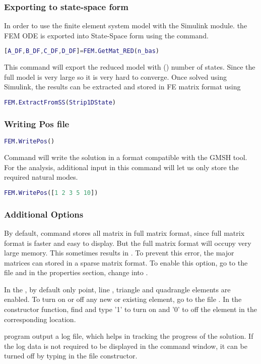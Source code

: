 \documentclass[main.tex]{subfiles}
\begin{document}
\subsubsection{Exporting to state-space form}
 In order to use the finite element system model with the Simulink module.  the FEM ODE is exported into State-Space form using the command.
 \begin{lstlisting}[language=matlab]
 [A_DF,B_DF,C_DF,D_DF]=FEM.GetMat_RED(n_bas)
 \end{lstlisting}
 This command will export the reduced model with () number of states. Since the full model is very large so it is very hard to converge. Once solved using Simulink, the results can be extracted and stored in FE matrix format using 
  \begin{lstlisting}[language=matlab]
 FEM.ExtractFromSS(Strip1DState) 
  \end{lstlisting}
  
\subsubsection{Writing Pos file}

  \begin{lstlisting}[language=matlab]
 FEM.WritePos() 
  \end{lstlisting}
  
  Command will write the solution in a format compatible with the GMSH tool. For the  analysis, additional input in this command will let us only store the required natural modes.
  
    \begin{lstlisting}[language=matlab]
 FEM.WritePos([1 2 3 5 10]) 
  \end{lstlisting}


 

\subsubsection{Additional Options}

By default,  command stores all matrix in full matrix format, since full matrix format is faster and easy to display. But the full matrix format will occupy very large memory. This sometimes results in  . To prevent this error, the major matrices can stored in a sparse matrix format. To enable this option, go to the file  and in the properties section, change  into . 

In the , by default only point, line , triangle and quadrangle elements are enabled. To turn on or off any new or existing element, go to the file . In the constructor function, find  and type  '1' to turn on and '0' to off the element in the corresponding location.

 program output a log file, which helps in tracking the progress of the solution. If the log data is not required to be displayed in the command window, it can be turned off by typing  in the  file constructor. 
\end{document}
